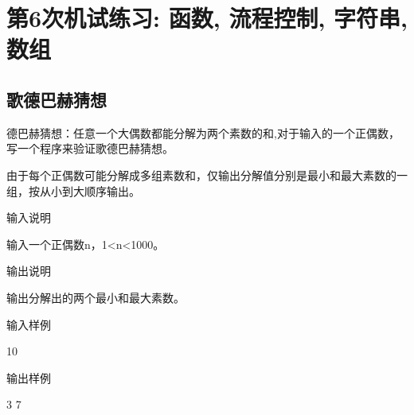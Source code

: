 %
%
%
\chapter{第6次机试练习: 函数, 流程控制, 字符串, 数组}

\section{歌德巴赫猜想}
德巴赫猜想：任意一个大偶数都能分解为两个素数的和,对于输入的一个正偶数，写一个程序来验证歌德巴赫猜想。

由于每个正偶数可能分解成多组素数和，仅输出分解值分别是最小和最大素数的一组，按从小到大顺序输出。

输入说明	

输入一个正偶数n，1<n<1000。

输出说明
	
输出分解出的两个最小和最大素数。

输入样例
	
10

输出样例
	
3 7

